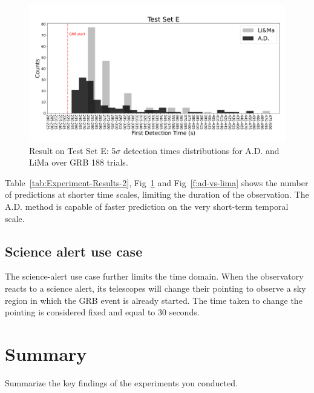 \begin{figure}[t]
\centering
\includegraphics[width=1\textwidth]{figures/experiments/ad_vs_li_ma_first_detections_testset_e.png}
\caption{Result on Test Set E: 5$\sigma$ detection times distributions for A.D. and LiMa over GRB 188 trials.}
\label{f:ad-vs-lima-first-detection}
\end{figure}


Table~\ref{tab:Experiment-Results-2}, Fig~\ref{f:ad-vs-lima-first-detection} and Fig~\ref{f:ad-vs-lima} shows the number of predictions at shorter time scales, limiting the duration of the observation. 
The A.D. method is capable of faster prediction on the very short-term temporal scale.  












\subsection{Science alert use case}
\label{s:Science-Alert-Results}
The science-alert use case further limits the time domain. When the observatory reacts to a science alert, its telescopes will change their pointing to observe a sky region in which the GRB event is already started. The time taken to change the pointing is considered fixed and equal to 30 seconds.  


\section{Summary}
\label{s:Experiments-Summary}

Summarize the key findings of the experiments you conducted.
